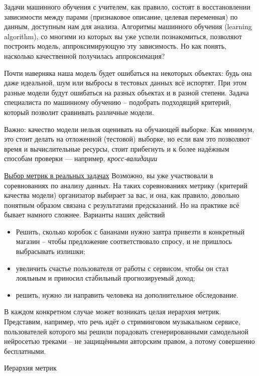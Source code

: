 Задачи машинного обучения с учителем, как правило, состоят в восстановлении зависимости между парами (признаковое
описание, целевая переменная) по данным, доступным нам для анализа.
Алгоритмы машинного обучения (learning algorithm), со многими из которых вы уже успели познакомиться, позволяют
построить модель, аппроксимирующую эту зависимость.
Но как понять, насколько качественной получилась аппроксимация?

Почти наверняка наша модель будет ошибаться на некоторых объектах: будь она даже идеальной, шум или выбросы в
тестовых данных всё испортят.
При этом разные модели будут ошибаться на разных объектах и в разной степени.
Задача специалиста по машинному обучению -- подобрать подходящий критерий, который позволит сравнивать различные
модели.

Важно: качество модели нельзя оценивать на обучающей выборке.
Как минимум, это стоит делать на отложенной (тестовой) выборке, но если вам это позволяют время и вычислительные
ресурсы, стоит прибегнуть и к более надёжным способам проверки — например, \textit{кросс-валидации}

\underline{Выбор метрик в реальных задачах}
Возможно, вы уже участвовали в соревнованиях по анализу данных.
На таких соревнованиях метрику (критерий качества модели) организатор выбирает за вас, и она, как правило, довольно
понятным образом связана с результатами предсказаний.
Но на практике всё бывает намного сложнее.
Варианты наших действий

\begin{itemize}
    \item Решить, сколько коробок с бананами нужно завтра привезти в конкретный магазин -- чтобы предложение
    соответствовало спросу, и не пришлось выбрасывать излишки;
    \item увеличить счастье пользователя от работы с сервисом, чтобы он стал лояльным и приносил стабильный
    прогнозируемый доход;
    \item решить, нужно ли направить человека на дополнительное обследование.
\end{itemize}

В каждом конкретном случае может возникать целая иерархия метрик.
Представим, например, что речь идёт о стриминговом музыкальном сервисе, пользователей которого мы решили порадовать
сгенерированными самодельной нейросетью треками -- не защищёнными авторским правом, а потому совершенно бесплатными.

Иерархия метрик

